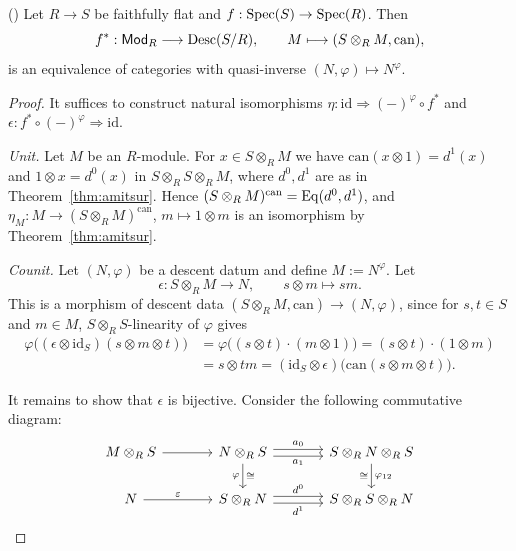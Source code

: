 \begin{theorem}\label{thm:faithfully-flat-descent-modules}
	(\cite[][Proposition~35.3.9, Tag 023N]{stacks-project})
	Let $R\to S$ be faithfully flat and $f:\operatorname{Spec}\!\left(S\right)\to\operatorname{Spec}\!\left(R\right)$. Then
	\[
	f^*:\mathsf{Mod}_R\longrightarrow\operatorname{Desc}(S/R),\qquad M\longmapsto(S\otimes_RM,\mathrm{can}),
	\]
	is an equivalence of categories with quasi-inverse $(N,\varphi)\mapsto N^\varphi$.
\end{theorem}

\begin{proof}
	It suffices to construct natural isomorphisms $\eta:\mathrm{id}\Rightarrow(-)^\varphi\circ f^*$ and $\epsilon:f^*\circ(-)^\varphi\Rightarrow\mathrm{id}$.
	
	\emph{Unit.} Let $M$ be an $R$-module. For $x\in S\otimes_RM$ we have $\mathrm{can}(x\otimes1)=d^1(x)$ and $1\otimes x=d^0(x)$ in $S\otimes_RS\otimes_RM$, where $d^0,d^1$ are as in Theorem~\ref{thm:amitsur}. Hence $(S\otimes_RM)^{\mathrm{can}}=\operatorname*{Eq}(d^0,d^1)$, and $\eta_M:M\to(S\otimes_RM)^{\mathrm{can}}$, $m\mapsto1\otimes m$ is an isomorphism by Theorem~\ref{thm:amitsur}.
	
	\emph{Counit.} Let $(N,\varphi)$ be a descent datum and define $M:=N^\varphi$. Let
	\[
	\epsilon:S\otimes_RM\longrightarrow N,\qquad s\otimes m\longmapsto sm .
	\]
	This is a morphism of descent data $(S\otimes_RM,\mathrm{can})\to(N,\varphi)$, since for $s,t\in S$ and $m\in M$, $S\otimes_RS$-linearity of $\varphi$ gives
	\begin{align*}
			\varphi\bigl((\epsilon\otimes\mathrm{id}_S)(s\otimes m\otimes t)\bigr) &= \varphi\bigl((s\otimes t)\cdot(m\otimes1)\bigr)=(s\otimes t)\cdot(1\otimes m) \\
			&= s\otimes tm = (\mathrm{id}_S\otimes\epsilon)\bigl(\mathrm{can}(s\otimes m\otimes t)\bigr).
	\end{align*}

	It remains to show that $\epsilon$ is bijective. Consider the following commutative diagram:
	\[
	\begin{tikzcd}[column sep=large]
		M\otimes_RS \arrow[r] & N\otimes_RS \arrow[r, shift left, "a_0"] \arrow[r, shift right, "a_1"'] \arrow[d, "\varphi"', "\cong"] & S\otimes_RN\otimes_RS \arrow[d, "\varphi_{12}", "\cong"'] \\
		N \arrow[r, "\varepsilon"] & S\otimes_RN \arrow[r, shift left, "d^0"] \arrow[r, shift right, "d^1"'] & S\otimes_RS\otimes_RN
	\end{tikzcd}
	\]
	

\end{proof}
